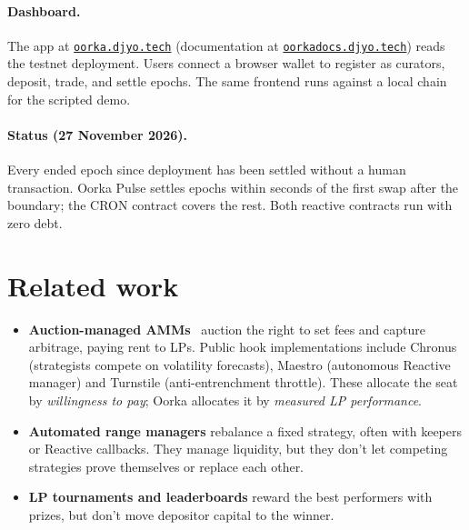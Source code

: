 \documentclass[11pt,a4paper]{article}
\begin{document}
\paragraph{Dashboard.} The app at \href{https://oorka.djyo.tech}{\texttt{oorka.djyo.tech}} (documentation at \href{https://oorkadocs.djyo.tech}{\texttt{oorkadocs.djyo.tech}}) reads the testnet deployment. Users connect a browser wallet to register as curators, deposit, trade, and settle epochs. The same frontend runs against a local chain for the scripted demo.

\paragraph{Status (27 November 2026).} Every ended epoch since deployment has been settled without a human transaction. Oorka Pulse settles epochs within seconds of the first swap after the boundary; the CRON contract covers the rest. Both reactive contracts run with zero debt.

\section{Related work}
\begin{itemize}
  \item \textbf{Auction-managed AMMs}~\cite{amamm} auction the right to set fees and capture arbitrage, paying rent to LPs. Public hook implementations include Chronus (strategists compete on volatility forecasts), Maestro (autonomous Reactive manager) and Turnstile (anti-entrenchment throttle). These allocate the seat by \emph{willingness to pay}; Oorka allocates it by \emph{measured LP performance}.
  \item \textbf{Automated range managers} rebalance a fixed strategy, often with keepers or Reactive callbacks. They manage liquidity, but they don't let competing strategies prove themselves or replace each other.
  \item \textbf{LP tournaments and leaderboards} reward the best performers with prizes, but don't move depositor capital to the winner.
\end{itemize}

\end{document}
